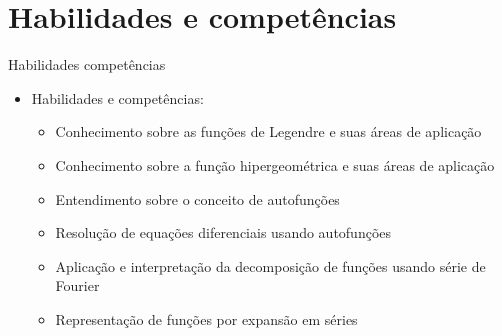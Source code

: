 \section[slide=true]{Habilidades e competências}
      \begin{slide}[toc=]{Habilidades competências}
         \begin{itemize}
	     \item Habilidades e competências:
		     \begin{itemize}
			     \item Conhecimento sobre as funções de Legendre e suas áreas de aplicação
			     \item Conhecimento sobre a função hipergeométrica e suas áreas de aplicação
			     \item Entendimento sobre o conceito de autofunções
			     \item Resolução de equações diferenciais usando autofunções
			     \item Aplicação e interpretação da decomposição de funções usando série de Fourier
			     \item Representação de funções por expansão em séries
	            \end{itemize}
         \end{itemize}
      \end{slide}


